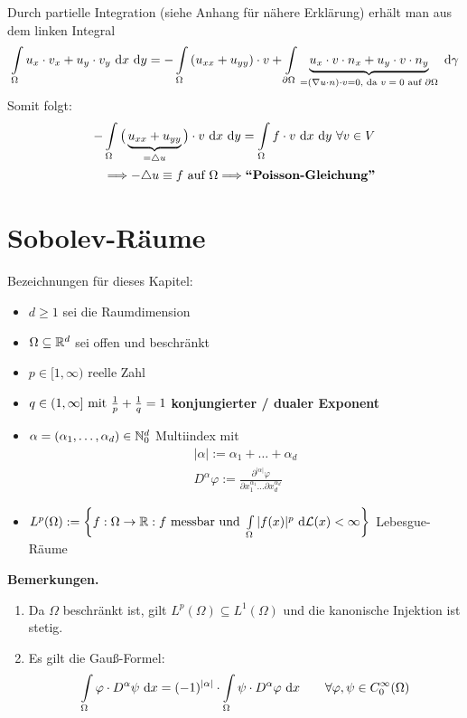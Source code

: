 Durch partielle Integration (siehe Anhang für nähere Erklärung) erhält man aus dem linken Integral
\begin{align*}
\int\limits_\Omega u_x\cdot v_x+u_y\cdot v_y\d x\d y
=-\int\limits_\Omega\left(u_{xx}+u_{yy}\right)\cdot v
+\int\limits_{\partial\Omega}\underbrace{u_x\cdot v\cdot n_x+u_y\cdot v\cdot n_y}_{=(\nabla u\cdot n)\cdot v=0\text{, da $v=0$ auf }\partial\Omega}\d\gamma
\end{align*}
Somit folgt:
\begin{align*}
-\int\limits_\Omega\big(\underbrace{u_{xx}+u_{yy}}_{=\laplace u}\big)\cdot v\d x\d y=\int\limits_\Omega f\cdot v\d x\d y~\forall v\in V\\
\Longrightarrow-\laplace u\equiv f\text{ auf }\Omega\Longrightarrow\textbf{``Poisson-Gleichung''}
\end{align*}

\section{Sobolev-Räume}
Bezeichnungen für dieses Kapitel:

\begin{itemize}
\item $d\geq1$ sei die Raumdimension
\item $\Omega\subseteq\R^d$ sei offen und beschränkt
\item $p\in[1,\infty)$ reelle Zahl
\item $q\in(1,\infty]\mit\frac{1}{p}+\frac{1}{q}=1$ \textbf{konjungierter / dualer Exponent}
\item $\alpha=(\alpha_1,\ldots,\alpha_d)\in\N_0^d$ Multiindex mit
\begin{align*}
|\alpha|:=\alpha_1+\ldots+\alpha_d\\
D^\alpha\varphi:=\frac{\partial^{|\alpha|}\varphi}{\partial x_1^{\alpha_1}\hdots\partial x_d^{\alpha_d}}
\end{align*}
\item $L^p(\Omega):=\left\lbrace f:\Omega\to\R:f\text{ messbar und }\int\limits_\Omega |f(x)|^p\d\mathcal{L}(x)<\infty\right\rbrace$ Lebesgue-Räume
\end{itemize}

\textbf{Bemerkungen.}
\begin{enumerate}
\item Da $\Omega$ beschränkt ist, gilt $L^p(\Omega)\subseteq L^1(\Omega)$ und die kanonische Injektion ist stetig.
\item Es gilt die Gauß-Formel:
\begin{align}\label{GaussFormel}
\int\limits_\Omega\varphi\cdot D^\alpha\psi\d x=(-1)^{|\alpha|}\cdot\int\limits_\Omega\psi\cdot D^\alpha\varphi\d x\qquad\forall \varphi,\psi\in C_0^\infty(\Omega)
\end{align}
\end{enumerate}

